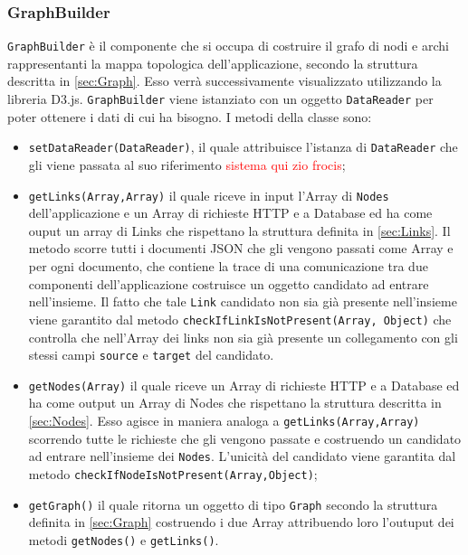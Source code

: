 \subsubsection{GraphBuilder}
\label{sec:GraphBuilder}
	\texttt{GraphBuilder} è il componente che si occupa di costruire il grafo di nodi e archi rappresentanti la mappa topologica dell'applicazione, secondo la struttura descritta in \ref{sec:Graph}. Esso verrà successivamente visualizzato utilizzando la libreria D3.js. \texttt{GraphBuilder} viene istanziato con un oggetto \texttt{DataReader} per poter ottenere i dati di cui ha bisogno.
	I metodi della classe sono:
	\begin{itemize}
		\item{\texttt{setDataReader(DataReader)}, il quale attribuisce l'istanza di \texttt{DataReader} che gli viene passata al suo riferimento \textcolor{red}{sistema qui zio frocis}; }
		
		\item{\texttt{getLinks(Array,Array)} il quale riceve in input l'Array di \texttt{Nodes} dell'applicazione e un Array di richieste HTTP e a Database ed ha come ouput un array di Links che rispettano la struttura definita in \ref{sec:Links}. Il metodo scorre tutti i documenti JSON che gli vengono passati come Array e per ogni documento, che contiene la trace di una comunicazione tra due componenti dell'applicazione costruisce un oggetto candidato ad entrare nell'insieme. Il fatto che tale \texttt{Link} candidato non sia già presente nell'insieme viene garantito dal metodo \texttt{checkIfLinkIsNotPresent(Array, Object)} che controlla che nell'Array dei links non sia già presente un collegamento con gli stessi campi \texttt{source} e \texttt{target} del candidato. }
		
		\item{\texttt{getNodes(Array)} il quale riceve un Array di richieste HTTP e a Database ed ha come output un Array di Nodes che rispettano la struttura descritta in \ref{sec:Nodes}. Esso agisce in maniera analoga a \texttt{getLinks(Array,Array)} scorrendo tutte le richieste che gli vengono passate e costruendo un candidato ad entrare nell'insieme dei \texttt{Nodes}. L'unicità del candidato viene garantita dal metodo \texttt{checkIfNodeIsNotPresent(Array,Object)};}
		
		\item{\texttt{getGraph()} il quale ritorna un oggetto di tipo \texttt{Graph} secondo la struttura definita in \ref{sec:Graph} costruendo i due Array attribuendo loro l'outuput dei metodi \texttt{getNodes()} e \texttt{getLinks()}.  }
	\end{itemize}


